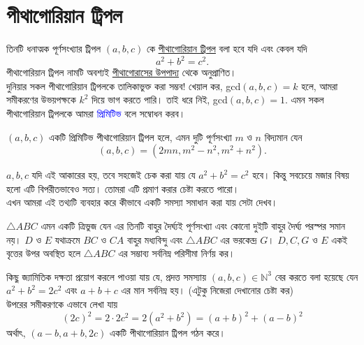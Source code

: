 \documentclass[11pt]{report}
\begin{document}
\newpage

\section{পীথাগোরিয়ান ট্রিপল}

তিনটি ধনাত্মক পূর্ণসংখ্যার ট্রিপল $(a, b, c)$ কে \href{https://en.wikipedia.org/wiki/Pythagorean_triple}{পীথাগোরিয়ান ট্রিপল} বলা হবে যদি এবং কেবল যদি $$a^2+b^2=c^2.$$ পীথাগোরিয়ান ট্রিপল নামটি অবশ্যই \href{https://en.wikipedia.org/wiki/Pythagorean_theorem}{পীথাগোরাসের উপপাদ্য} থেকে অনুপ্রাণিত।\\

দুনিয়ার সকল পীথাগোরিয়ান ট্রিপলকে তালিকাভুক্ত করা সম্ভব! খেয়াল কর, gcd$(a,b,c)=k$ হলে, আমরা সমীকরণের উভয়পক্ষকে $k^2$ দিয়ে ভাগ করতে পারি। তাই ধরে নিই, gcd$(a,b,c)=1$. এমন সকল পীথাগোরিয়ান ট্রিপলকে আমরা \textcolor{blue}{প্রিমিটিভ} বলে সম্বোধন করব।\\

\begin{tcolorbox}[colframe=blue!80!blue]

$(a,b,c)$ একটি প্রিমিটিভ পীথাগোরিয়ান ট্রিপল হলে, এমন দুটি পূর্ণসংখ্যা $m$ ও $n$ বিদ্যমান যেন $$(a,b,c) = (2mn, m^2-n^2, m^2+n^2).$$

\end{tcolorbox}

$a,b,c$ যদি এই আকারের হয়, তবে সহজেই চেক করা যায় যে $a^2+b^2=c^2$ হবে। কিন্তু সবচেয়ে মজার বিষয় হলো এটি বিপরীতভাবেও সত্য। তোমরা এটি প্রমাণ করার চেষ্টা করতে পারো।\\

এখন আমরা এই তথ্যটি ব্যবহার করে কীভাবে একটি সমস্যা সমাধান করা যায় সেটা দেখব।\\

\begin{tcolorbox}[colframe=black!80!green,title= INMO 2018]
$\triangle ABC$ এমন একটি ত্রিভুজ যেন এর তিনটি বাহুর দৈর্ঘ্যই পূর্ণসংখ্যা এবং কোনো দুইটি বাহুর দৈর্ঘ্য পরস্পর সমান নয়। $D$ ও $E$ যথাক্রমে $BC$ ও $CA$ বাহুর মধ্যবিন্দু এবং $\triangle ABC$ এর ভরকেন্দ্র $G$। $D, C, G$ ও $E$ একই বৃত্তের উপর অবস্থিত হলে $\triangle ABC$ এর সম্ভাব্য সর্বনিম্ন পরিসীমা নির্ণয় কর।
\end{tcolorbox}

কিছু জ্যামিতিক দক্ষতা প্রয়োগ করলে পাওয়া যায় যে, প্রদত্ত সমস্যায় $(a,b,c) \in \mathbb{N}^3$ বের করতে বলা হয়েছে যেন $a^2+b^2=2c^2$ এবং $a+b+c$ এর মান সর্বনিম্ন হয়। (এটুকু নিজেরা দেখানোর চেষ্টা কর)\\

উপরের সমীকরণকে এভাবে লেখা যায় $$(2c)^2 = 2 \cdot 2c^2 = 2(a^2+b^2) = (a+b)^2 + (a-b)^2$$ অর্থাৎ, $(a-b,a+b,2c)$ একটি পীথাগোরিয়ান ট্রিপল গঠন করে।\\
\end{document}

